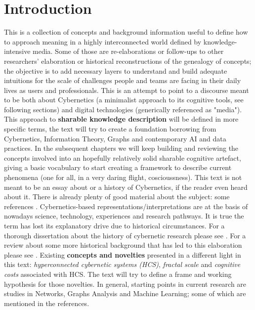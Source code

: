 \documentclass[14pt]{extarticle}
\begin{document}
\section*{Introduction}%
\label{sec:intro}%
\hspace*{15mm}This is a collection of concepts and background information useful to define how to approach meaning in a highly interconnected world defined by knowledge-intensive media. Some of those are re-elaborations or follow-ups to other researchers' elaboration or historical reconstructions of the genealogy of concepts; the objective is to add necessary layers to understand and build adequate intuitions for the scale of challenges people and teams are facing in their daily lives as users and professionals.
\newline
\hspace*{15mm}This is an attempt to point to a discourse meant to be both about Cybernetics (a minimalist approach to its cognitive tools, see following sections) and digital technologies (generically referenced as "media"). This approach to \textbf{sharable knowledge description} will be defined in more specific terms, the text will try to create a foundation borrowing from Cybernetics, Information Theory, Graphs and contemporary AI and data practices. In the subsequent chapters we will keep building and reviewing the concepts involved into an hopefully relatively solid sharable cognitive artefact, giving a basic vocabulary to start creating a framework to describe current phenomena (one for all, in a very daring flight, coscioussness).
\newline
\hspace*{15mm}This text is not meant to be an essay about or a history of Cybernetics, if the reader even heard about it. There is already plenty of good material about the subject: some references \cite{ASChistoryrefs,EOLSSvallee,UMPLEBYcybUSA,ROSNAYhistcyb}. Cybernetics-based representations/interpretations are at the basis of nowadays science, technology, experiences and research pathways. It is true the term has lost its explanatory drive due to historical circumstances. For a thorough dissertation about the history of cybernetic research please see \cite{DUPUYmechanization}. For a review about some more historical background that has led to this elaboration please see \cite{heims1980john}. Existing \textbf{concepts and novelties} presented in a different light in this text: \textit{hyperconnected cybernetic systems (HCS)}, \textit{fractal scale} and \textit{cognitive costs} associated with HCS. The text will try to define a frame and working hypothesis for those novelties. In general, starting points in current research are studies in Networks, Graphs Analysis and Machine Learning; some of which are mentioned in the references.
\end{document}
